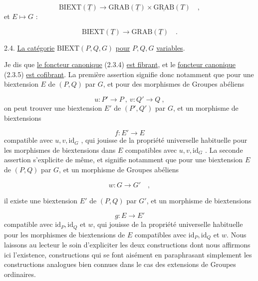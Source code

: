 \begin{equation}\tag{2.3.4}
\mathrm{BIEXT}(\underline{T}) \longrightarrow \mathrm{GRAB}(\underline{T}) \times \underline{\mathrm{GRAB}}(T) \quad ,
\end{equation}
et $E \longmapsto G$ :

\begin{equation}\tag{2.3.5}
\mathrm{BIEXT}(\underline{T}) \longrightarrow \mathrm{GRAB}(\underline{T}) \quad .
\end{equation}

2.4. \underline{La catégorie} $\mathrm{BIEXT}(P,Q,G)$  \underline{pour} $P,Q,G$ \underline{variables}.

Je dis que \underline{le foncteur canonique} (2.3.4) \underline{est fibrant}, et le \underline{foncteur canonique} (2.3.5) \underline{est cofibrant}. La première assertion signifie donc notamment que pour une biextension $E$ de $(P,Q)$ par $G$, et pour des morphismes de Groupes abéliens

\begin{equation*}
u : P' \longrightarrow P \ , \ v : Q' \longrightarrow Q \ ,
\end{equation*}
on peut trouver une biextension $E'$ de $(P',Q')$ par $G$, et un morphisme de biextensions

\begin{equation*}
f : E' \longrightarrow E
\end{equation*}
compatible avec $u,v,\mathrm{id}_G$ , qui jouisse de la propriété universelle habituelle pour les morphismes de biextensions dans $E$ compatibles avec $u,v,\mathrm{id}_G$ . La seconde assertion s'explicite de même, et signifie notamment que pour une biextension $E$ de $(P,Q)$ par $G$, et un morphisme de Groupes abéliens

\begin{equation*}
w : G \longrightarrow G' \quad , 
\end{equation*}


il existe une biextension $E'$ de  $(P,Q)$  par $G'$, et un morphisme de biextensions

\begin{equation*}
g : E \longrightarrow E'
\end{equation*}
compatible avec $\mathrm{id}_P,\mathrm{id}_Q$ et $w$, qui jouisse de la propriété universelle habituelle pour les morphismes de biextensions de $E$ compatibles avec $\mathrm{id}_P,\mathrm{id}_Q$ et $w$. Nous laissons au lecteur le soin d'expliciter les deux constructions dont nous affirmons ici l'existence, constructions qui se font aisément en paraphrasant simplement les constructions analogues bien connues dans le cas des extensions de Groupes ordinaires.

